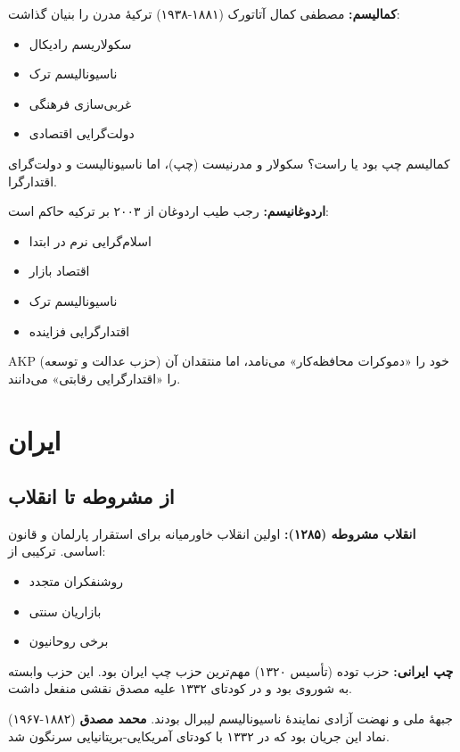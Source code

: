 \textbf{کمالیسم:}
مصطفی کمال آتاتورک (۱۸۸۱-۱۹۳۸) ترکیهٔ مدرن را بنیان گذاشت:
\begin{itemize}
    \item سکولاریسم رادیکال
    \item ناسیونالیسم ترک
    \item غربی‌سازی فرهنگی
    \item دولت‌گرایی اقتصادی
\end{itemize}

کمالیسم چپ بود یا راست؟ سکولار و مدرنیست (چپ)، اما ناسیونالیست و دولت‌گرای اقتدارگرا.

\textbf{اردوغانیسم:}
رجب طیب اردوغان از ۲۰۰۳ بر ترکیه حاکم است:
\begin{itemize}
    \item اسلام‌گرایی نرم در ابتدا
    \item اقتصاد بازار
    \item ناسیونالیسم ترک
    \item اقتدارگرایی فزاینده
\end{itemize}

AKP (حزب عدالت و توسعه) خود را «دموکرات محافظه‌کار» می‌نامد، اما منتقدان آن را «اقتدارگرایی رقابتی» می‌دانند.


\section{ایران}

\subsection{از مشروطه تا انقلاب}


\textbf{انقلاب مشروطه (۱۲۸۵):}
اولین انقلاب خاورمیانه برای استقرار پارلمان و قانون اساسی. ترکیبی از:
\begin{itemize}
    \item روشنفکران متجدد
    \item بازاریان سنتی
    \item برخی روحانیون
\end{itemize}

\textbf{چپ ایرانی:}
حزب توده (تأسیس ۱۳۲۰) مهم‌ترین حزب چپ ایران بود. این حزب وابسته به شوروی بود و در کودتای ۱۳۳۲ علیه مصدق نقشی منفعل داشت.

جبههٔ ملی و نهضت آزادی نمایندهٔ ناسیونالیسم لیبرال بودند. \textbf{محمد مصدق} (۱۸۸۲-۱۹۶۷) نماد این جریان بود که در ۱۳۳۲ با کودتای آمریکایی-بریتانیایی سرنگون شد.

